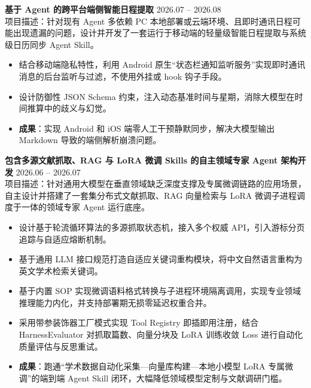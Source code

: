 \documentclass[11pt]{article}
\newlength{\interProjectSpacing}
\newcommand{\projectsep}{\vspace{\interProjectSpacing}}
\newlength{\intraProjectTitleSep}
\newcommand{\titlebreak}{\\[\intraProjectTitleSep]}
\newlength{\intraProjectListTopSep}
\begin{document}
\textbf{基于 Agent 的跨平台端侧智能日程提取} \hfill 2026.07 -- 2026.08 \titlebreak
项目描述：针对现有 Agent 多依赖 PC 本地部署或云端环境、且即时通讯日程可能出现遗漏的问题，设计并开发了一套运行于移动端的轻量级智能日程提取与系统级日历同步 Agent Skill。
\begin{itemize}[nosep, topsep=\intraProjectListTopSep]
    \item 结合移动端隐私特性，利用 Android 原生“状态栏通知监听服务”实现即时通讯消息的后台监听与过滤，不使用外挂或 hook 钩子手段。
    \item 设计防御性 JSON Schema 约束，注入动态基准时间与星期，消除大模型在时间推算中的歧义与幻觉。
    \item \textbf{成果}：实现 Android 和 iOS 端零人工干预静默同步，解决大模型输出 Markdown 导致的端侧解析崩溃问题。
\end{itemize}

\projectsep

\textbf{包含多源文献抓取、RAG 与 LoRA 微调 Skills 的自主领域专家 Agent 架构开发} \hfill 2026.06 -- 2026.07 \titlebreak
项目描述：针对通用大模型在垂直领域缺乏深度支撑及专属微调链路的应用场景，自主设计并搭建了一套集分布式文献抓取、RAG 向量检索与 LoRA 微调子进程调度于一体的领域专家 Agent 运行底座。
\begin{itemize}[nosep, topsep=\intraProjectListTopSep]
    \item 设计基于轮流循环算法的多源抓取状态机，接入多个权威 API，引入游标分页追踪与自适应熔断机制。
    \item 基于通用 LLM 接口规范打造自适应关键词重构模块，将中文自然语言重构为英文学术检索关键词。
    \item 基于内置 SOP 实现微调语料格式转换与子进程环境隔离调用，实现专业领域推理能力内化，并支持部署期无损零延迟权重合并。
    \item 采用带参装饰器工厂模式实现 Tool Registry 即插即用注册，结合 HarnessEvaluator 对抓取篇数、向量分块及 LoRA 训练收敛 Loss 进行自动化质量评估与反思重试。
    \item \textbf{成果}：跑通“学术数据自动化采集—向量库构建—本地小模型 LoRA 专属微调”的端到端 Agent Skill 闭环，大幅降低领域模型定制与文献调研门槛。
\end{itemize}
\end{document}
